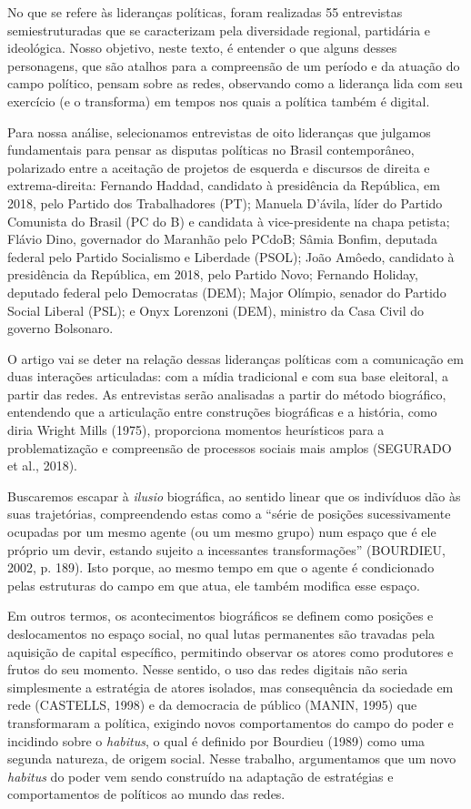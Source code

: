 No que se refere às lideranças políticas, foram realizadas 55
entrevistas semiestruturadas que se caracterizam pela diversidade
regional, partidária e ideológica. Nosso objetivo, neste texto, é
entender o que alguns desses personagens, que são atalhos para a
compreensão de um período e da atuação do campo político, pensam sobre
as redes, observando como a liderança lida com seu exercício (e o
transforma) em tempos nos quais a política também é digital.

Para nossa análise, selecionamos entrevistas de oito lideranças que
julgamos fundamentais para pensar as disputas políticas no Brasil
contemporâneo, polarizado entre a aceitação de projetos de esquerda e
discursos de direita e extrema-direita: Fernando Haddad, candidato à
presidência da República, em 2018, pelo Partido dos Trabalhadores (PT);
Manuela D'ávila, líder do Partido Comunista do Brasil (PC do B) e
candidata à vice-presidente na chapa petista; Flávio Dino, governador do
Maranhão pelo PCdoB; Sâmia Bonfim, deputada federal pelo Partido
Socialismo e Liberdade (PSOL); João Amôedo, candidato à presidência da
República, em 2018, pelo Partido Novo; Fernando Holiday, deputado
federal pelo Democratas (DEM); Major Olímpio, senador do Partido Social
Liberal (PSL); e Onyx Lorenzoni (DEM), ministro da Casa Civil do governo
Bolsonaro.

O artigo vai se deter na relação dessas lideranças políticas com a
comunicação em duas interações articuladas: com a mídia tradicional e
com sua base eleitoral, a partir das redes. As entrevistas serão
analisadas a partir do método biográfico, entendendo que a articulação
entre construções biográficas e a história, como diria Wright Mills
(1975), proporciona momentos heurísticos para a problematização e
compreensão de processos sociais mais amplos (SEGURADO et al., 2018).

Buscaremos escapar à \emph{ilusio} biográfica, ao sentido linear que os
indivíduos dão às suas trajetórias, compreendendo estas como a ``série
de posições sucessivamente ocupadas por um mesmo agente (ou um mesmo
grupo) num espaço que é ele próprio um devir, estando sujeito a
incessantes transformações'' (BOURDIEU, 2002, p. 189). Isto porque, ao
mesmo tempo em que o agente é condicionado pelas estruturas do campo em
que atua, ele também modifica esse espaço.

Em outros termos, os acontecimentos biográficos se definem como posições
e deslocamentos no espaço social, no qual lutas permanentes são travadas
pela aquisição de capital específico, permitindo observar os atores como
produtores e frutos do seu momento. Nesse sentido, o uso das redes
digitais não seria simplesmente a estratégia de atores isolados, mas
consequência da sociedade em rede (CASTELLS, 1998) e da democracia de
público (MANIN, 1995) que transformaram a política, exigindo novos
comportamentos do campo do poder e incidindo sobre o \emph{habitus}, o
qual é definido por Bourdieu (1989) como uma segunda natureza, de origem
social. Nesse trabalho, argumentamos que um novo \emph{habitus} do poder
vem sendo construído na adaptação de estratégias e comportamentos de
políticos ao mundo das redes.

